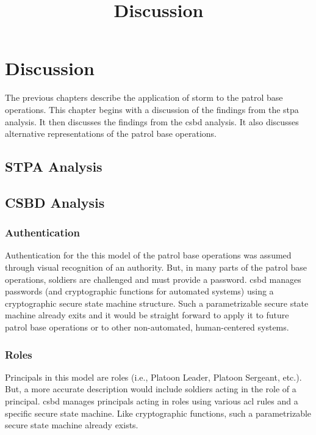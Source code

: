 \documentclass[../../main/main.tex]{subfiles}
\begin{document}
\title{Discussion}

\chapter{Discussion}\label{chp:discussion}
The previous chapters describe the application of \gls{storm} to the patrol base operations.   This chapter begins with a discussion of the findings from the \gls{stpa} analysis.  It then discusses the findings from the \gls{csbd} analysis.   It also discusses alternative representations of the patrol base operations. 


\section{STPA Analysis}\label{sec:stpadiscussion}

\section{CSBD Analysis}\label{sec:csbddiscussion}

\subsection{Authentication}
Authentication for the this model of the patrol base operations was assumed through visual recognition of an authority.  But, in many parts of the patrol base operations, soldiers are challenged and must provide a password.  \gls{csbd} manages passwords (and cryptographic functions for automated systems) using a cryptographic secure state machine structure.  Such a parametrizable secure state machine already exits and it would be straight forward to apply it to future patrol base operations or to other non-automated, human-centered systems.

\subsection{Roles}
Principals in this model are roles (i.e., Platoon Leader, Platoon Sergeant, etc.).  But, a more accurate description would include soldiers acting in the role of a principal.  \gls{csbd} manages principals acting in roles using various \gls{acl} rules and a specific secure state machine.  Like cryptographic functions, such a parametrizable secure state machine already exists.  
\end{document}
